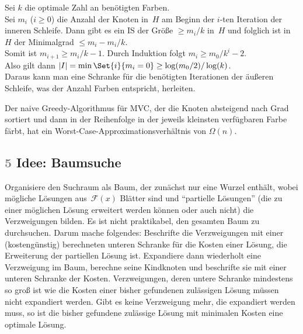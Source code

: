 \documentclass{cheat-sheet}
\newcommand{\Feasible}{\mathcal{F}} %
\newcommand{\scriptSection}[1]{\textcolor{gray}{#1}\enspace}
\begin{document}
\begin{beweisskizze}
  Sei $k$ die optimale Zahl an benötigten Farben. \\
  Sei $m_i$ ($i \geq 0$) die Anzahl der Knoten in~$H$ am Beginn der $i$-ten Iteration der inneren Schleife.
  Dann gibt es ein IS der Größe $\geq m_i/k$ in~$H$ und folglich ist in~$H$ der Minimalgrad $\leq m_i - m_i/k$. \\
  Somit ist $m_{i+1} \geq m_i/k - 1$.
  Durch Induktion folgt $m_i \geq m_0/k^i - 2$. \\
  Also gilt dann $\abs{I} = \min \Set{i}{m_i = 0} \geq \log(m_0/2) / \log(k)$. \\
  Daraus kann man eine Schranke für die benötigten Iterationen der äußeren Schleife, was der Anzahl Farben entspricht, herleiten.
\end{beweisskizze}

\begin{bem}
  Der naive Greedy-Algorithmus für MVC, der die Knoten absteigend nach Grad sortiert und dann in der Reihenfolge in der jeweils kleinsten verfügbaren Farbe färbt, hat ein Worst-Case-Approximationsverhältnis von $\Omega(n)$.
\end{bem}

\subsection{\scriptSection{5} Idee: Baumsuche}



\begin{strategie}
  Organisiere den Suchraum als Baum, der zunächst nur eine Wurzel enthält, wobei mögliche Lösungen aus~$\Feasible(x)$ Blätter sind und "`partielle Lösungen"' (die zu einer möglichen Lösung erweitert werden können oder auch nicht) die Verzweigungen bilden.
  Es ist nicht praktikabel, den gesamten Baum zu durchsuchen.
  Darum mache folgendes:
  Beschrifte die Verzweigungen mit einer (kostengünstig) berechneten unteren Schranke für die Kosten einer Lösung, die Erweiterung der partiellen Lösung ist.
  Expandiere dann wiederholt eine Verzweigung im Baum, \dh{} berechne seine Kindknoten und beschrifte sie mit einer unteren Schranke der Kosten.
  Verzweigungen, deren untere Schranke mindestens so groß ist wie die Kosten einer bisher gefundenen zulässigen Lösung müssen nicht expandiert werden.
  Gibt es keine Verzweigung mehr, die expandiert werden muss, so ist die bisher gefundene zulässige Lösung mit minimalen Kosten eine optimale Lösung.
\end{strategie}
\end{document}
